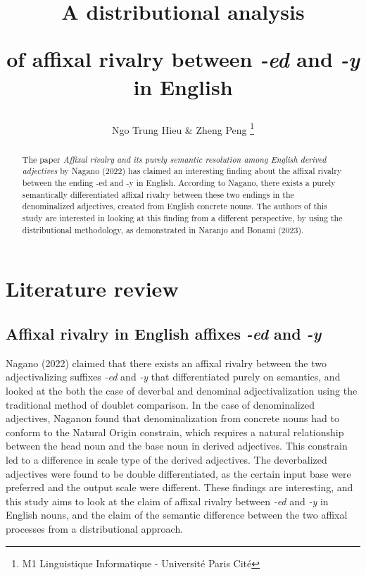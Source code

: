 \documentclass[12pt]{article}
\title{A distributional analysis 

of affixal rivalry between \emph{-ed} and \emph{-y} in English}
\author{Ngo Trung Hieu & Zheng Peng \thanks{M1 Linguistique Informatique - Université Paris Cité}}
\date{}
\begin{document}
\maketitle

\begin{abstract}
    The paper \emph{Affixal rivalry and its purely semantic resolution among English derived adjectives} by Nagano (2022) has claimed an interesting finding about the affixal rivalry between the ending -ed and -y in English. According to Nagano, there exists a purely semantically differentiated affixal rivalry between these two endings in the denominalized adjectives, created from English concrete nouns. The authors of this study are interested in looking at this finding from a different perspective, by using the distributional methodology, as demonstrated in Naranjo and Bonami (2023).
\end{abstract}

\section{Literature review}
\subsection{Affixal rivalry in English affixes \emph{-ed} and \emph{-y}}
Nagano (2022) claimed that there exists an affixal rivalry between the two adjectivalizing suffixes \emph{-ed} and \emph{-y} that differentiated purely on semantics, and looked at the both the case of deverbal and denominal adjectivalization using the traditional method of doublet comparison. In the case of denominalized adjectives, Naganon found that denominalization from concrete nouns had to conform to the Natural Origin constrain, which requires a natural relationship between the head noun and the base noun in derived adjectives. This constrain led to a difference in scale type of the derived adjectives. The deverbalized adjectives were found to be double differentiated, as the certain input base were preferred and the output scale were different. These findings are interesting, and this study aims to look at the claim of affixal rivalry between \emph{-ed} and \emph{-y} in English nouns, and the claim of the semantic difference between the two affixal processes from a distributional approach.
\end{document}
